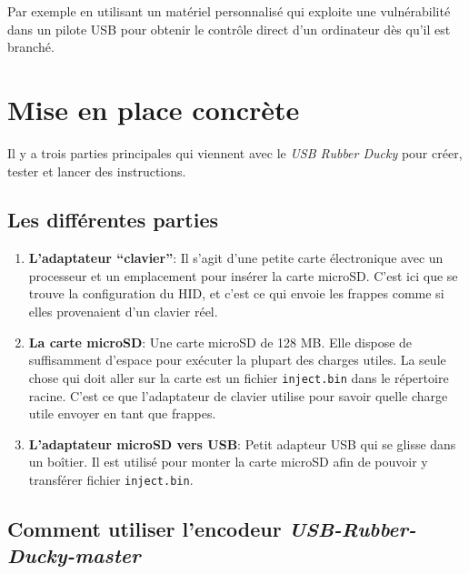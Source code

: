 \documentclass[
  french,
  paper=a4,
  ,captions=tableheading
]{scrartcl}
\begin{document}
Par exemple en utilisant un matériel personnalisé qui exploite une
vulnérabilité dans un pilote USB pour obtenir le contrôle direct d'un
ordinateur dès qu'il est branché.

\hypertarget{mise-en-place-concruxe8te}{%
\section{Mise en place concrète}\label{mise-en-place-concruxe8te}}

Il y a trois parties principales qui viennent avec le \emph{USB Rubber
Ducky} pour créer, tester et lancer des instructions.

\hypertarget{les-diffuxe9rentes-parties}{%
\subsection{Les différentes parties}\label{les-diffuxe9rentes-parties}}

\begin{enumerate}
\def\labelenumi{\arabic{enumi}.}
\item
  \textbf{L'adaptateur ``clavier''}: Il s'agit d'une petite carte
  électronique avec un processeur et un emplacement pour insérer la
  carte microSD. C'est ici que se trouve la configuration du HID, et
  c'est ce qui envoie les frappes comme si elles provenaient d'un
  clavier réel.
\item
  \textbf{La carte microSD}: Une carte microSD de 128 MB. Elle dispose
  de suffisamment d'espace pour exécuter la plupart des charges utiles.
  La seule chose qui doit aller sur la carte est un fichier
  \texttt{inject.bin} dans le répertoire racine. C'est ce que
  l'adaptateur de clavier utilise pour savoir quelle charge utile
  envoyer en tant que frappes.
\item
  \textbf{L'adaptateur microSD vers USB}: Petit adapteur USB qui se
  glisse dans un boîtier. Il est utilisé pour monter la carte microSD
  afin de pouvoir y transférer fichier \texttt{inject.bin}.
\end{enumerate}

\hypertarget{comment-utiliser-lencodeur-usb-rubber-ducky-master}{%
\subsection{\texorpdfstring{Comment utiliser l'encodeur
\emph{USB-Rubber-Ducky-master}}{Comment utiliser l'encodeur USB-Rubber-Ducky-master}}\label{comment-utiliser-lencodeur-usb-rubber-ducky-master}}
\end{document}
